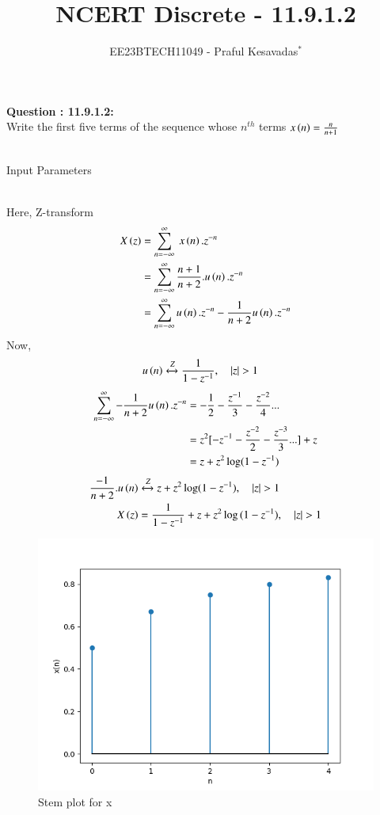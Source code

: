 \documentclass[journal,12pt,onecolumn]{IEEEtran}
\theoremstyle{remark}
\begin{document}

\vspace{3cm}

\title{NCERT Discrete - 11.9.1.2}
\author{EE23BTECH11049 - Praful Kesavadas$^{*}$%
}
\maketitle

\bigskip

\renewcommand{\thefigure}{\theenumi}
\renewcommand{\thetable}{\theenumi}

\textbf{Question : 11.9.1.2:}\\
Write the first five terms of the sequence whose $n^{th}$ terms  $x\left(n\right) = \frac{n}{n+1}$\\
\solution\\
\begin{table}[ht!]
\centering

\caption{Input Parameters}
\end{table}\\
Here, Z-transform
\begin{align}
X\left(z\right) &= \sum_{n=-\infty}^\infty\ x\left(n\right).z^{-n}\\
&= \sum_{n=-\infty}^\infty \frac{n+1}{n+2}.u\left(n\right). z^{-n}\\
&= \sum_{n=-\infty}^\infty u\left(n\right).z^{-n} - \frac{1}{n+2} u\left(n\right).z^{-n}
\end{align}
Now, 
\begin{align}
u\brak{n} &\xleftrightarrow Z  \frac{1}{1-z^{-1}}, \quad{|z|>1}
\end{align}
\begin{align*}
\sum_{n=-\infty}^\infty - \frac{1}{n+2} u\left(n\right).z^{-n} &= -\frac{1}{2}-\frac{z^{-1}}{3}-\frac{z^{-2}}{4}...\\
&= z^2[-z^{-1}-\frac{z^{-2}}{2}-\frac{z^{-3}}{3}...]+z \\
&= z+ z^2\log(1-z^{-1})
\end{align*}
\begin{align}
\frac{-1}{n+2}.u\brak{n} &\xleftrightarrow Z  z+z^2\log(1-z^{-1}), \quad{|z|>1}\\
X\brak{z} &= \frac{1}{1-z^{-1}} + z+ z^2\log{(1-z^{-1})} ,\quad{|z|>1}
\end{align}
\begin{figure}[ht!]
    \centering
    \includegraphics[width=\columnwidth]{figs/graph1.png}
    \caption{Stem plot for x}
    \label{fig:11.9.1.2fig1}
\end{figure}
\end{document}
